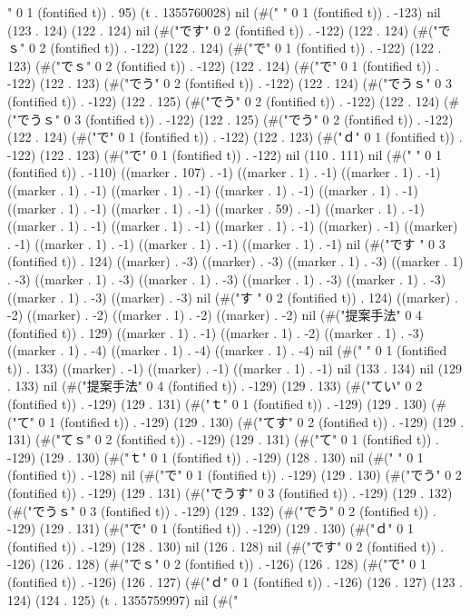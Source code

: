 " 0 1 (fontified t)) . 95) (t . 1355760028) nil (#("
" 0 1 (fontified t)) . -123) nil (123 . 124) (122 . 124) nil (#("です" 0 2 (fontified t)) . -122) (122 . 124) (#("でｓ" 0 2 (fontified t)) . -122) (122 . 124) (#("で" 0 1 (fontified t)) . -122) (122 . 123) (#("でｓ" 0 2 (fontified t)) . -122) (122 . 124) (#("で" 0 1 (fontified t)) . -122) (122 . 123) (#("でう" 0 2 (fontified t)) . -122) (122 . 124) (#("でうｓ" 0 3 (fontified t)) . -122) (122 . 125) (#("でう" 0 2 (fontified t)) . -122) (122 . 124) (#("でうｓ" 0 3 (fontified t)) . -122) (122 . 125) (#("でう" 0 2 (fontified t)) . -122) (122 . 124) (#("で" 0 1 (fontified t)) . -122) (122 . 123) (#("ｄ" 0 1 (fontified t)) . -122) (122 . 123) (#("で" 0 1 (fontified t)) . -122) nil (110 . 111) nil (#("
" 0 1 (fontified t)) . -110) ((marker . 107) . -1) ((marker . 1) . -1) ((marker . 1) . -1) ((marker . 1) . -1) ((marker . 1) . -1) ((marker . 1) . -1) ((marker . 1) . -1) ((marker . 1) . -1) ((marker . 1) . -1) ((marker . 59) . -1) ((marker . 1) . -1) ((marker . 1) . -1) ((marker . 1) . -1) ((marker . 1) . -1) ((marker) . -1) ((marker) . -1) ((marker . 1) . -1) ((marker . 1) . -1) ((marker . 1) . -1) nil (#("です
" 0 3 (fontified t)) . 124) ((marker) . -3) ((marker) . -3) ((marker . 1) . -3) ((marker . 1) . -3) ((marker . 1) . -3) ((marker . 1) . -3) ((marker . 1) . -3) ((marker . 1) . -3) ((marker . 1) . -3) ((marker) . -3) nil (#("す
" 0 2 (fontified t)) . 124) ((marker) . -2) ((marker) . -2) ((marker . 1) . -2) ((marker) . -2) nil (#("提案手法" 0 4 (fontified t)) . 129) ((marker . 1) . -1) ((marker . 1) . -2) ((marker . 1) . -3) ((marker . 1) . -4) ((marker . 1) . -4) ((marker . 1) . -4) nil (#("
" 0 1 (fontified t)) . 133) ((marker) . -1) ((marker) . -1) ((marker . 1) . -1) nil (133 . 134) nil (129 . 133) nil (#("提案手法" 0 4 (fontified t)) . -129) (129 . 133) (#("てい" 0 2 (fontified t)) . -129) (129 . 131) (#("ｔ" 0 1 (fontified t)) . -129) (129 . 130) (#("て" 0 1 (fontified t)) . -129) (129 . 130) (#("てす" 0 2 (fontified t)) . -129) (129 . 131) (#("てｓ" 0 2 (fontified t)) . -129) (129 . 131) (#("て" 0 1 (fontified t)) . -129) (129 . 130) (#("ｔ" 0 1 (fontified t)) . -129) (128 . 130) nil (#("
" 0 1 (fontified t)) . -128) nil (#("で" 0 1 (fontified t)) . -129) (129 . 130) (#("でう" 0 2 (fontified t)) . -129) (129 . 131) (#("でうす" 0 3 (fontified t)) . -129) (129 . 132) (#("でうｓ" 0 3 (fontified t)) . -129) (129 . 132) (#("でう" 0 2 (fontified t)) . -129) (129 . 131) (#("で" 0 1 (fontified t)) . -129) (129 . 130) (#("ｄ" 0 1 (fontified t)) . -129) (128 . 130) nil (126 . 128) nil (#("です" 0 2 (fontified t)) . -126) (126 . 128) (#("でｓ" 0 2 (fontified t)) . -126) (126 . 128) (#("で" 0 1 (fontified t)) . -126) (126 . 127) (#("ｄ" 0 1 (fontified t)) . -126) (126 . 127) (123 . 124) (124 . 125) (t . 1355759997) nil (#("
